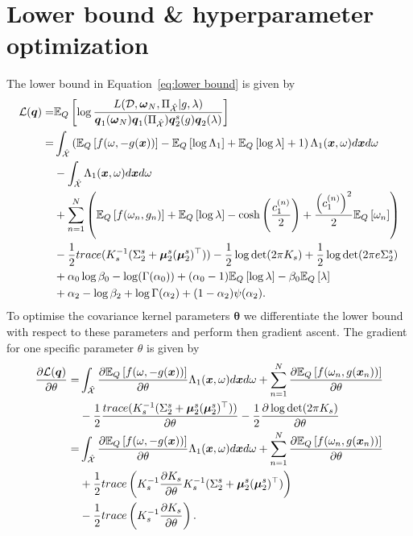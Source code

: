 \section{Lower bound \& hyperparameter optimization}\label{app:lower bound}
The lower bound in Equation~\eqref{eq:lower bound} is given by
\begin{equation}
\begin{split}
\mathcal{L}(\boldsymbol{q}) = & \mathbb{E}_{Q}\left[ \log \frac{L({\cal D}, \boldsymbol{\omega}_N, \Pi_{\hat{\mathcal{X}}}\vert g, \lambda )}{\boldsymbol{q}_1(\boldsymbol{\omega}_N)\boldsymbol{q}_1(\Pi_{\hat{\mathcal{X}}})\boldsymbol{q}_2^s(g)\boldsymbol{q}_2(\lambda)} \right] \\
= & \int_{\hat{\mathcal{X}}}  \left(\mathbb{E}_{Q}\left[ f(\omega,-g(\boldsymbol{x})) \right] - \mathbb{E}_{Q}\left[ \log \Lambda_{1} \right] + \mathbb{E}_{Q}\left[ \log \lambda \right] + 1\right) \Lambda_{1}(\boldsymbol{x},\omega)d\boldsymbol{x} d\omega \\
& - \int_{\hat{\mathcal{X}}}\Lambda_{1}(\boldsymbol{x},\omega)d\boldsymbol{x} d\omega \\
& + \sum_{n=1}^N\left(\mathbb{E}_{Q}\left[ f(\omega_n,g_n) \right] + \mathbb{E}_{Q}\left[ \log\lambda \right] - \cosh\left(\frac{c_1^{(n)}}{2}\right) + \frac{\left(c_1^{(n)}\right)^2}{2}\mathbb{E}_{Q}\left[ \omega_n \right] \right)
\\
& -\frac{1}{2}trace(K_s^{-1}(\Sigma_2^s + \boldsymbol{\mu}_2^s(\boldsymbol{\mu}_2^s)^\top))- \frac{1}{2}\log \det(2\pi K_s) + \frac{1}{2}\log\det(2\pi e \Sigma_2^s) \\
& + \alpha_0\log \beta_0 - \log(\Gamma(\alpha_0)) + (\alpha_0 - 1)\mathbb{E}_{Q}\left[ \log \lambda \right] - \beta_0 \mathbb{E}_{Q}\left[ \lambda \right] \\
& + \alpha_{2} - \log \beta_{2} + \log \Gamma(\alpha_{2}) + (1-\alpha_{2})\psi(\alpha_{2}).
\end{split}
\end{equation}
To optimise the covariance kernel parameters $\boldsymbol{\theta}$ we differentiate the lower bound with respect to these parameters and perform then gradient ascent. The gradient for one specific parameter $\theta$ is given by
\begin{equation}
\begin{split}
\frac{\partial \mathcal{L}(\boldsymbol{q})}{\partial \theta} = & \int_{\hat{\mathcal{X}}}  \frac{\partial \mathbb{E}_{Q}\left[ f(\omega,-g(\boldsymbol{x})) \right]}{\partial \theta}\Lambda_{1}(\boldsymbol{x},\omega)d\boldsymbol{x} d\omega + \sum_{n=1}^N\frac{\partial \mathbb{E}_{Q}\left[  f(\omega_n,g(\boldsymbol{x}_n)) \right]}{\partial \theta}
\\
& -\frac{1}{2}\frac{trace(K_s^{-1}(\Sigma^s_2 + \boldsymbol{\mu}^s_2(\boldsymbol{\mu}_2^s)^\top))}{\partial \theta}- \frac{1}{2}\frac{\partial \log \det(2\pi K_s)}{\partial \theta} \\
=  & \int_{\hat{\mathcal{X}}}  \frac{\partial \mathbb{E}_{Q}\left[ f(\omega,-g(\boldsymbol{x})) \right]}{\partial \theta}\Lambda_{1}(\boldsymbol{x},\omega)d\boldsymbol{x} d\omega + \sum_{n=1}^N\frac{\partial \mathbb{E}_{Q}\left[ f(\omega_n,g(\boldsymbol{x}_n)) \right]}{\partial \theta} \\
& +\frac{1}{2}trace\left(K_s^{-1}\frac{\partial K_s}{\partial \theta} K_s^{-1}(\Sigma^s_2 + \boldsymbol{\mu}^s_2(\boldsymbol{\mu}^s_2)^\top)\right)\\
& - \frac{1}{2}trace\left(K_s^{-1}\frac{\partial K_s}{\partial \theta}\right).
\end{split}
\end{equation}
